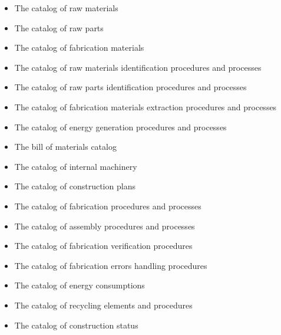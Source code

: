 \begin{itemize}
\item The catalog of raw materials
\item The catalog of raw parts
\item The catalog of fabrication materials
\item The catalog of raw materials identification procedures and
processes
\item The catalog of raw parts identification procedures and processes
\item The catalog of fabrication materials extraction procedures and
processes
\item The catalog of energy generation procedures and processes
\item The bill of materials catalog
\item The catalog of internal machinery
\item The catalog of construction plans
\item The catalog of fabrication procedures and processes
\item The catalog of assembly procedures and processes
\item The catalog of fabrication verification procedures
\item The catalog of fabrication errors handling procedures
\item The catalog of energy consumptions
\item The catalog of recycling elements and procedures
\item The catalog of construction status
\end{itemize}

